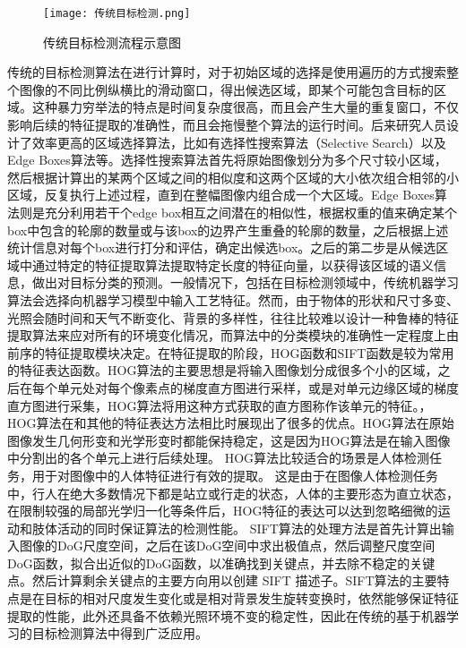 \begin{figure}[htbp]
    \centering
    \texttt{[image: 传统目标检测.png]}
    \caption{传统目标检测流程示意图}
    \label{ct}
\end{figure}

传统的目标检测算法在进行计算时，对于初始区域的选择是使用遍历的方式搜索整个图像的不同比例纵横比的滑动窗口，得出候选区域，即某个可能包含目标的区域\cite{胡伏原2020基于卷积神经网络的目标检测算法综述,kira1992feature}。这种暴力穷举法的特点是时间复杂度很高，而且会产生大量的重复窗口，不仅影响后续的特征提取的准确性，而且会拖慢整个算法的运行时间。后来研究人员设计了效率更高的区域选择算法，比如有选择性搜索算法（Selective Search）\cite{uijlings2013selective}以及Edge Boxes算法\cite{zitnick2014edge}等。选择性搜索算法首先将原始图像划分为多个尺寸较小区域，然后根据计算出的某两个区域之间的相似度和这两个区域的大小依次组合相邻的小区域，反复执行上述过程，直到在整幅图像内组合成一个大区域。Edge Boxes算法则是充分利用若干个edge box相互之间潜在的相似性，根据权重的值来确定某个box中包含的轮廓的数量或与该box的边界产生重叠的轮廓的数量，之后根据上述统计信息对每个box进行打分和评估，确定出候选box。之后的第二步是从候选区域中通过特定的特征提取算法提取特定长度的特征向量，以获得该区域的语义信息，做出对目标分类的预测。一般情况下，包括在目标检测领域中，传统机器学习算法会选择向机器学习模型中输入工艺特征。然而，由于物体的形状和尺寸多变、光照会随时间和天气不断变化、背景的多样性，往往比较难以设计一种鲁棒的特征提取算法来应对所有的环境变化情况，而算法中的分类模块的准确性一定程度上由前序的特征提取模块决定。在特征提取的阶段，HOG函数\cite{he1990texture}和SIFT函数\cite{lowe1999object}是较为常用的特征表达函数。HOG算法的主要思想是将输入图像划分成很多个小的区域，之后在每个单元处对每个像素点的梯度直方图进行采样，或是对单元边缘区域的梯度直方图进行采集，HOG算法将用这种方式获取的直方图称作该单元的特征。，HOG算法在和其他的特征表达方法相比时展现出了很多的优点。HOG算法在原始图像发生几何形变和光学形变时都能保持稳定，这是因为HOG算法是在输入图像中分割出的各个单元上进行后续处理。
HOG算法比较适合的场景是人体检测任务，用于对图像中的人体特征进行有效的提取。
这是由于在图像人体检测任务中，行人在绝大多数情况下都是站立或行走的状态，人体的主要形态为直立状态，在限制较强的局部光学归一化等条件后，HOG特征的表达可以达到忽略细微的运动和肢体活动的同时保证算法的检测性能。
SIFT算法的处理方法是首先计算出输入图像的DoG尺度空间，之后在该DoG空间中求出极值点，然后调整尺度空间DoG函数，拟合出近似的DoG函数，以准确找到关键点，并去除不稳定的关键点。然后计算剩余关键点的主要方向用以创建 SIFT 描述子。SIFT算法的主要特点是在目标的相对尺度发生变化或是相对背景发生旋转变换时，依然能够保证特征提取的性能，此外还具备不依赖光照环境不变的稳定性，因此在传统的基于机器学习的目标检测算法中得到广泛应用。

